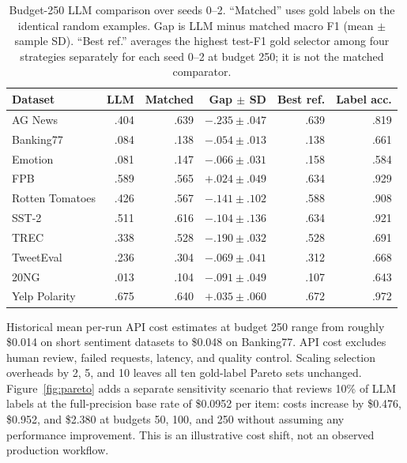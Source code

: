 \documentclass[conference]{IEEEtran}
\begin{document}
\begin{table}[t]
\caption{Budget-250 LLM comparison over seeds 0--2. ``Matched'' uses gold labels on the identical random examples. Gap is LLM minus matched macro F1 (mean $\pm$ sample SD). ``Best ref.'' averages the highest test-F1 gold selector among four strategies separately for each seed 0--2 at budget 250; it is not the matched comparator.}
\label{tab:llm}
\centering
\scriptsize
\setlength{\tabcolsep}{2.5pt}
\begin{tabular}{lrrrrr}
\toprule
Dataset & LLM & Matched & Gap $\pm$ SD & Best ref. & Label acc. \\
\midrule
AG News & .404 & .639 & $-.235\pm.047$ & .639 & .819 \\
Banking77 & .084 & .138 & $-.054\pm.013$ & .138 & .661 \\
Emotion & .081 & .147 & $-.066\pm.031$ & .158 & .584 \\
FPB & .589 & .565 & $+.024\pm.049$ & .634 & .929 \\
Rotten Tomatoes & .426 & .567 & $-.141\pm.102$ & .588 & .908 \\
SST-2 & .511 & .616 & $-.104\pm.136$ & .634 & .921 \\
TREC & .338 & .528 & $-.190\pm.032$ & .528 & .691 \\
TweetEval & .236 & .304 & $-.069\pm.041$ & .312 & .668 \\
20NG & .013 & .104 & $-.091\pm.049$ & .107 & .643 \\
Yelp Polarity & .675 & .640 & $+.035\pm.060$ & .672 & .972 \\
\bottomrule
\end{tabular}
\end{table}

Historical mean per-run API cost estimates at budget 250 range from roughly \$0.014 on short sentiment datasets to \$0.048 on Banking77. API cost excludes human review, failed requests, latency, and quality control. Scaling selection overheads by 2, 5, and 10 leaves all ten gold-label Pareto sets unchanged. Figure~\ref{fig:pareto} adds a separate sensitivity scenario that reviews 10\% of LLM labels at the full-precision base rate of \$0.0952 per item: costs increase by \$0.476, \$0.952, and \$2.380 at budgets 50, 100, and 250 without assuming any performance improvement. This is an illustrative cost shift, not an observed production workflow.
\end{document}
